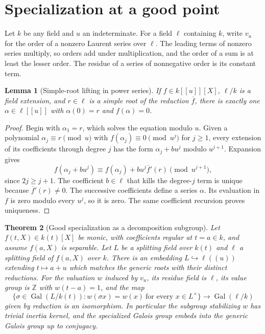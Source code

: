 \documentclass[11pt,oneside,openany]{book}
\newtheorem{theorem}{Theorem}[chapter]
\newtheorem{lemma}[theorem]{Lemma}
\theoremstyle{definition}
\theoremstyle{remark}
\begin{document}
\section{Specialization at a good point}

Let \(k\) be any field and \(u\) an indeterminate. For a field
\(\ell\) containing \(k\), write \(v_u\) for the order of a nonzero
Laurent series over \(\ell\). The leading terms of nonzero
series multiply, so orders add under multiplication, and the order of
a sum is at least the lesser order. The residue of a series of
nonnegative order is its constant term.

\begin{lemma}[Simple-root lifting in power series]
\label{res:IG09}
If \(f\in k[[u]][X]\), \(\ell/k\) is a field extension, and
\(r\in\ell\) is a simple root of the reduction \(\overline f\),
there is exactly one \(\alpha\in\ell[[u]]\) with
\(\alpha(0)=r\) and \(f(\alpha)=0\).
\end{lemma}

\begin{proof}
Begin with \(\alpha_1=r\), which solves the equation modulo \(u\).
Given a polynomial \(\alpha_j\equiv r\pmod u\) with
\(f(\alpha_j)\equiv0\pmod{u^j}\) for \(j\geq1\),
every extension of its coefficients through degree \(j\) has
the form \(\alpha_j+b u^j\) modulo \(u^{j+1}\).
Expansion gives
\[
 f(\alpha_j+b u^j)\equiv f(\alpha_j)+b u^j\overline f'(r)
          \pmod{u^{j+1}},
\]
since \(2j\geq j+1\). The coefficient \(b\in\ell\) that kills the
degree-\(j\) term is unique because \(\overline f'(r)\ne0\).
The successive coefficients define a series \(\alpha\).
Its evaluation in \(f\) is zero modulo every \(u^j\), so it
is zero. The same coefficient recursion proves uniqueness.
\end{proof}

\begin{theorem}[Good specialization as a decomposition subgroup]
\label{res:IG10}
Let \(f(t,X)\in k(t)[X]\) be monic, with coefficients regular at
\(t=a\in k\), and assume \(f(a,X)\) is separable. Let \(L\) be a
splitting field over \(k(t)\) and \(\ell\) a splitting field of
\(f(a,X)\) over \(k\). There is an embedding
\(L\hookrightarrow\ell((u))\) extending \(t\mapsto a+u\)
which matches the generic roots with their distinct reductions.
For the valuation \(w\) induced by \(v_u\), its residue field is
\(\ell\), its value group is \(\mathbb Z\) with \(w(t-a)=1\),
and the map
\[
 \{\sigma\in\operatorname{Gal}(L/k(t)):
           w(\sigma x)=w(x)\ \text{for every }x\in L^\times\}
       \longrightarrow \operatorname{Gal}(\ell/k)
\]
given by reduction is an isomorphism. In particular the subgroup
stabilizing \(w\) has trivial inertia kernel, and the specialized
Galois group embeds into the generic Galois group up to conjugacy.
\end{theorem}
\end{document}
